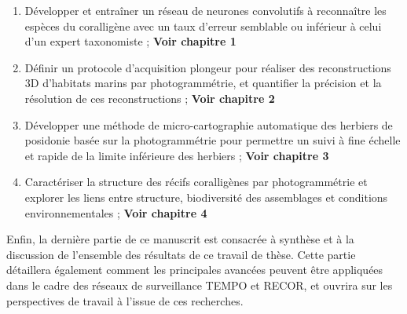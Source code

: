 \begin{enumerate}
    \item Développer et entraîner un réseau de neurones convolutifs à reconnaître les espèces du coralligène avec un taux d’erreur semblable ou inférieur à celui d’un expert taxonomiste ; \textbf{Voir chapitre 1}
    
    \item Définir un protocole d’acquisition plongeur pour réaliser des reconstructions 3D d’habitats marins par photogrammétrie, et quantifier la précision et la résolution de ces reconstructions ; \textbf{Voir chapitre 2}
    
    \item Développer une méthode de micro-cartographie automatique des herbiers de posidonie basée sur la photogrammétrie pour permettre un suivi à fine échelle et rapide de la limite inférieure des herbiers ; \textbf{Voir chapitre 3}
    
    \item Caractériser la structure des récifs coralligènes par photogrammétrie et explorer les liens entre structure, biodiversité des assemblages et conditions environnementales ; \textbf{Voir chapitre 4}
    
\end{enumerate}

Enfin, la dernière partie de ce manuscrit est consacrée à synthèse et à la discussion de l’ensemble des résultats de ce travail de thèse. Cette partie détaillera également comment les principales avancées peuvent être appliquées dans le cadre des réseaux de surveillance TEMPO et RECOR, et ouvrira sur les perspectives de travail à l’issue de ces recherches.